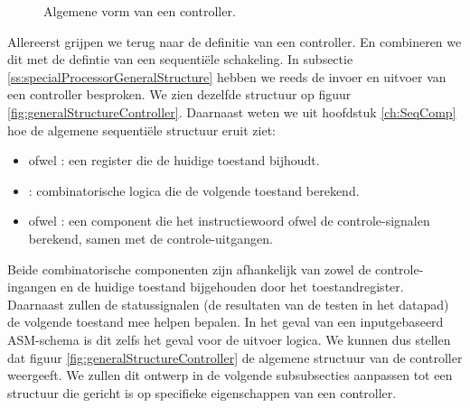 \begin{figure}[hbt]
\caption{Algemene vorm van een controller.}
\end{figure}
Allereerst grijpen we terug naar de definitie van een controller. En combineren we dit met de defintie van een sequenti\"ele schakeling. In subsectie \ref{ss:specialProcessorGeneralStructure} hebben we reeds de invoer en uitvoer van een controller besproken. We zien dezelfde structuur op figuur \ref{fig:generalStructureController}. Daarnaast weten we uit hoofdstuk \ref{ch:SeqComp} hoe de algemene sequenti\"ele structuur eruit ziet:
\begin{itemize}
 \item {} ofwel : een register die de huidige toestand bijhoudt.
 \item {}: combinatorische logica die de volgende toestand berekend.
 \item {} ofwel : een component die het instructiewoord ofwel de controle-signalen berekend, samen met de controle-uitgangen.
\end{itemize}
Beide combinatorische componenten zijn afhankelijk van zowel de controle-ingangen en de huidige toestand bijgehouden door het toestandregister. Daarnaast zullen de statussignalen (de resultaten van de testen in het datapad) de volgende toestand mee helpen bepalen. In het geval van een inputgebaseerd ASM-schema is dit zelfs het geval voor de uitvoer logica. We kunnen dus stellen dat figuur \ref{fig:generalStructureController} de algemene structuur van de controller weergeeft. We zullen dit ontwerp in de volgende subsubsecties aanpassen tot een structuur die gericht is op specifieke eigenschappen van een controller.
